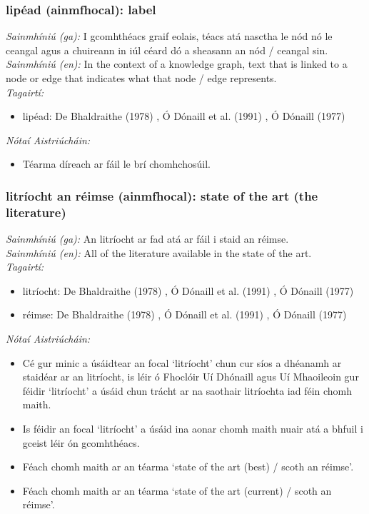 \documentclass{article}
\begin{document}
\subsubsection*{lipéad (ainmfhocal): label}
 \noindent \textit{Sainmhíniú (ga):} I gcomhthéacs graif eolais, téacs atá nasctha le nód nó le ceangal agus a chuireann in iúl céard dó a sheasann an nód / ceangal sin.
\\
 \noindent \textit{Sainmhíniú (en):} In the context of a knowledge graph, text that is linked to a node or edge that indicates what that node / edge represents.
\\
 \noindent \textit{Tagairtí:}
\begin{itemize}
	\item lipéad: De Bhaldraithe (1978) \cite{de-bhaldraithe}, Ó Dónaill et al. (1991) \cite{focloir-beag}, Ó Dónaill (1977) \cite{odonaill}
\end{itemize}

 \noindent \textit{Nótaí Aistriúcháin:}
\begin{itemize}
	\item Téarma díreach ar fáil le brí chomhchosúil.
\end{itemize}


\subsubsection*{litríocht an réimse (ainmfhocal): state of the art (the literature)}
 \noindent \textit{Sainmhíniú (ga):} An litríocht ar fad atá ar fáil i staid an réimse.
\\
 \noindent \textit{Sainmhíniú (en):} All of the literature available in the state of the art.
\\
 \noindent \textit{Tagairtí:}
\begin{itemize}
	\item litríocht: De Bhaldraithe (1978) \cite{de-bhaldraithe}, Ó Dónaill et al. (1991) \cite{focloir-beag}, Ó Dónaill (1977) \cite{odonaill}
	\item réimse: De Bhaldraithe (1978) \cite{de-bhaldraithe}, Ó Dónaill et al. (1991) \cite{focloir-beag}, Ó Dónaill (1977) \cite{odonaill}
\end{itemize}

 \noindent \textit{Nótaí Aistriúcháin:}
\begin{itemize}
	\item Cé gur minic a úsáidtear an focal `litríocht' chun cur síos a dhéanamh ar staidéar ar an litríocht, is léir ó Fhoclóir Uí Dhónaill agus Uí Mhaoileoin gur féidir `litríocht' a úsáid chun trácht ar na saothair litríochta iad féin chomh maith.
	\item Is féidir an focal `litríocht' a úsáid ina aonar chomh maith nuair atá a bhfuil i gceist léir ón gcomhthéacs.
	\item Féach chomh maith ar an téarma `state of the art (best) / scoth an réimse'.
	\item Féach chomh maith ar an téarma `state of the art (current) / scoth an réimse'.
\end{itemize}
\end{document}
